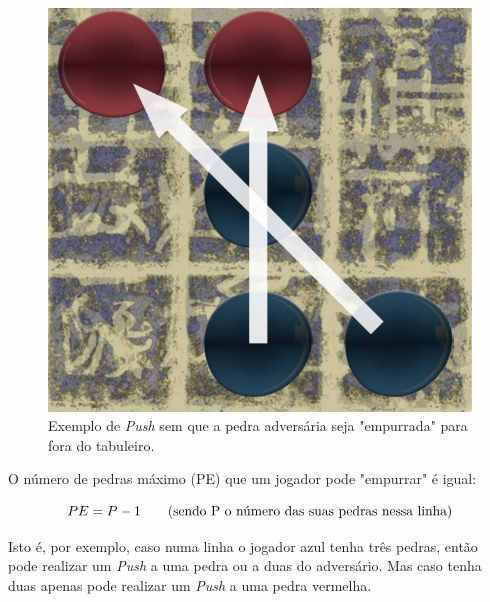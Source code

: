 \documentclass[a4paper]{article}
\begin{document}
\begin{figure}[!htb]
	\centering
	\includegraphics[scale=0.3]{push.png} 
	\caption{Exemplo de \textit{Push} sem que a pedra adversária seja "empurrada" para fora do tabuleiro.}
\end{figure}

O número de pedras máximo (PE) que um jogador pode "empurrar" é igual:

\begin{equation}
PE = P - 1 \text{\hspace{7mm}(sendo P o número das suas pedras nessa linha)}
\end{equation}

Isto é, por exemplo, caso numa linha o jogador azul tenha três pedras, então pode realizar um  \textit{Push} a uma pedra ou a duas do adversário. Mas caso tenha duas apenas pode realizar um  \textit{Push} a uma pedra vermelha.
\end{document}
